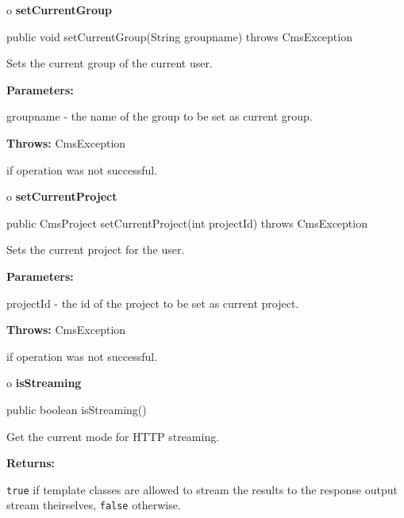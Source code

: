 o {\bf setCurrentGroup} 

\begin{PRE}
 public void setCurrentGroup(String groupname) throws CmsException
\end{PRE}

\begin{description}
\htmlDD Sets the current group of the current user. 

\begin{description}
\item {\bf Parameters:}  

groupname - the name of the group to be set as current group.  
\item {\bf Throws:} CmsException  

if operation was not successful.  
\end{description}

\end{description}

o {\bf setCurrentProject} 

\begin{PRE}
 public CmsProject setCurrentProject(int projectId) throws CmsException
\end{PRE}

\begin{description}
\htmlDD Sets the current project for the user. 

\begin{description}
\item {\bf Parameters:}  

projectId - the id of the project to be set as current project.  
\item {\bf Throws:} CmsException  

if operation was not successful.  
\end{description}

\end{description}

o {\bf isStreaming} 

\begin{PRE}
 public boolean isStreaming()
\end{PRE}

\begin{description}
\htmlDD Get the current mode for HTTP streaming. 

\begin{description}
\item {\bf Returns:}  

{\tt true} if template classes are allowed to stream the  results to the
response output stream theirselves, {\tt false} otherwise.  
\end{description}

\end{description}

